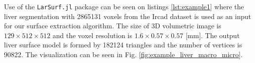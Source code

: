 

Use of the \texttt{LarSurf.jl} package can be seen on listings \ref{lst:example1} where the liver segmentation with 2865131 voxels from the
Ircad dataset is used as an input for our surface extraction algorithm. The size of 3D volumetric 
image is $129 \times 512 \times 512$
and the voxel resolution is $1.6\times0.57\times0.57$ [mm]. 
The output liver surface model is formed by  182124 triangles and the number of vertices is 90822. 
The visualization can 
be seen in Fig. \ref{fig:example_liver_macro_micro}. 


